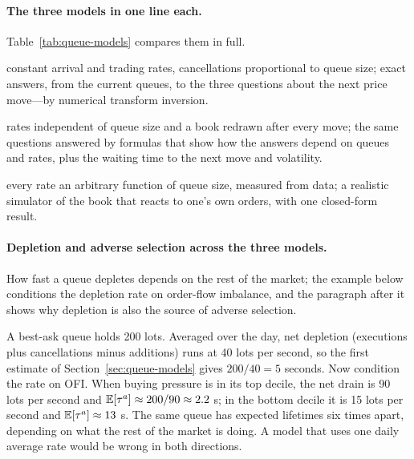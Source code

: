 \paragraph{The three models in one line each.} Table~\ref{tab:queue-models} compares them in full.
\begin{description}[leftmargin=1.5em,style=nextline,itemsep=2pt]
\item[Cont--Stoikov--Talreja (Section~\ref{sec:cst})] constant arrival and trading rates, cancellations
  proportional to queue size; exact answers, from the current queues, to the three questions about the next
  price move---by numerical transform inversion.
\item[Cont--de Larrard (Section~\ref{sec:cdl})] rates independent of queue size and a book redrawn after every
  move; the same questions answered by formulas that show how the answers depend on queues and rates, plus
  the waiting time to the next move and volatility.
\item[Queue-reactive (Section~\ref{sec:qr})] every rate an arbitrary function of queue size, measured from
  data; a realistic simulator of the book that reacts to one's own orders, with one closed-form result.
\end{description}

\paragraph{Depletion and adverse selection across the three models.} How fast a queue depletes
depends on the rest of the market; the example below conditions the depletion rate on order-flow
imbalance, and the paragraph after it shows why depletion is also the source of adverse selection.

\begin{example}
\label{ex:fpt}
A best-ask queue holds 200 lots. Averaged over the day, net depletion (executions plus
cancellations minus additions) runs at 40 lots per second, so the first estimate of
Section~\ref{sec:queue-models} gives $200/40 = 5$ seconds. Now condition the rate on OFI. When buying
pressure is in its top decile, the net drain is 90 lots per second and
$\mathbb{E}[\tau^a] \approx 200/90 \approx 2.2$ s; in the bottom decile it is 15 lots per second and
$\mathbb{E}[\tau^a] \approx 13$ s. The same queue has expected lifetimes six times apart, depending on what the
rest of the market is doing. A model that uses one daily average rate would be wrong in both directions.
\end{example}

